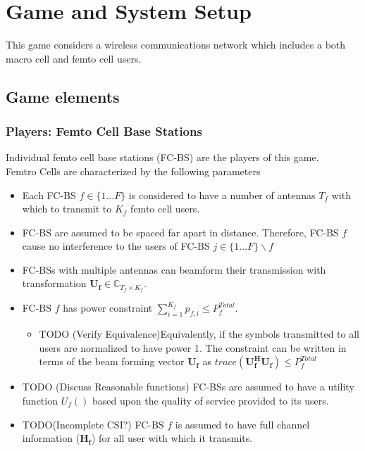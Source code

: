 \documentclass[12pt]{article}
\begin{document}
\section{Game and System Setup}

This game considers a wireless communications network which includes a both macro cell and femto cell users.

\subsection{Game elements}
\subsubsection{Players: Femto Cell Base Stations}


Individual femto cell base stations (FC-BS) are the players of this game.
\\
Femtro Cells are characterized by the following parameters
\begin{itemize}
\item Each FC-BS  $f \in \{1 ... F\}$ is considered to have a number of antennas $T_f$ with which to transmit to $K_f$ femto cell users.
\\
\item FC-BS are assumed to be spaced far apart in distance. Therefore, FC-BS $f$ cause no interference to the users of FC-BS $j \in \{1 ... F\}\backslash f$
\\
\item FC-BSs with multiple antennas can beamform their transmission with transformation $\mathbf{U_f} \in \mathbb{C}_{T_f \times K_f}$.
\\
\item 
FC-BS $f$ has power constraint  $\sum^{K_f}_{i=1} p_{f,i} \leq P^{Total}_{f} $. 
\begin{itemize}
\item TODO (Verify Equivalence)Equivalently, if the symbols transmitted to all users are normalized to have power 1. The constraint can be written in terms of the beam forming vector $\mathbf{U_f}$ as $trace(\mathbf{U_f^H}\mathbf{U_f}) \leq P^{Total}_{f}$
\end{itemize}

\item 
TODO (Discuss Reasonable functions) FC-BSs are assumed to have a utility function $U_f()$ based upon the quality of service provided to its users.
\\
\item TODO(Incomplete CSI?) FC-BS $f$ is assumed to have full channel information ($\mathbf{H_f}$) for all user  with which it transmits.
\\
\end{itemize}
\end{document}
